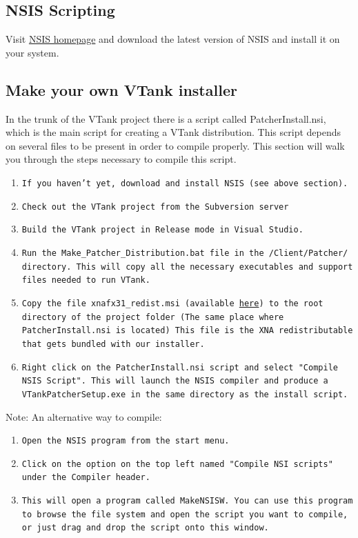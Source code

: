 \subsection{NSIS Scripting}
Visit \href{http://nsis.sourceforge.net/}{NSIS homepage} and download the latest version of NSIS and install it on your system. 

\subsection{Make your own VTank installer}

In the trunk of the VTank project there is a script called PatcherInstall.nsi, which is the main script for creating a VTank distribution. This script depends on several files to be present in order to compile properly. This section will walk you through the steps necessary to compile this script. 

\begin{enumerate}
\item \texttt{If you haven't yet, download and install NSIS (see above section).}
\item \texttt{Check out the VTank project from the Subversion server}
\item \texttt{Build the VTank project in Release mode in Visual Studio.}
\item \texttt{Run the Make\_Patcher\_Distribution.bat file in the /Client/Patcher/ directory. This will copy all the necessary executables and support files needed to run VTank.}
\item \texttt{Copy the file xnafx31\_redist.msi (available \href{http://www.microsoft.com/downloads/info.aspx?na=90&p=&SrcDisplayLang=en&SrcCategoryId=&SrcFamilyId=53867a2a-e249-4560-8011-98eb3e799ef2&u=http\%3a\%2f\%2fdownload.microsoft.com\%2fdownload\%2f5\%2f9\%2f1\%2f5912526C-B950-4662-99B6-119A83E60E5C\%2fxnafx31_redist.msi}{here}) to the root directory of the project folder (The same place where PatcherInstall.nsi is located) This file is the XNA redistributable that gets bundled with our installer.}
\item \texttt{Right click on the PatcherInstall.nsi script and select "Compile NSIS Script". This will launch the NSIS compiler and produce a VTankPatcherSetup.exe in the same directory as the install script.}
\end{enumerate}

Note: An alternative way to compile: 
\begin{enumerate}
\item \texttt{Open the NSIS program from the start menu.}
\item \texttt{Click on the option on the top left named "Compile NSI scripts" under the Compiler header.}
\item \texttt{This will open a program called MakeNSISW. You can use this program to browse the file system and open the script you want to compile, or just drag and drop the script onto this window.}
\end{enumerate}


